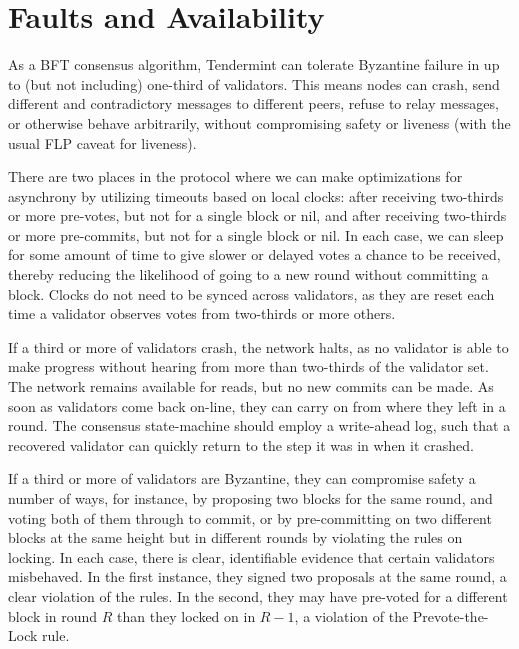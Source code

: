%
%
%


\section{Faults and Availability}

As a BFT consensus algorithm, Tendermint can tolerate Byzantine failure in up to (but not including) one-third of validators.
This means nodes can crash, send different and contradictory messages to different peers, refuse to relay messages, or otherwise behave arbitrarily,
without compromising safety or liveness (with the usual FLP caveat for liveness).

There are two places in the protocol where we can make optimizations for asynchrony by utilizing timeouts based on local clocks:
after receiving two-thirds or more pre-votes, but not for a single block or nil, and after receiving two-thirds or more pre-commits, 
but not for a single block or nil.
In each case, we can sleep for some amount of time to give slower or delayed votes a chance to be received,
thereby reducing the likelihood of going to a new round without committing a block.
Clocks do not need to be synced across validators, as they are reset each time a validator observes votes from two-thirds or more others.

If a third or more of validators crash, the network halts, 
as no validator is able to make progress without hearing from more than two-thirds of the validator set.
The network remains available for reads, but no new commits can be made.
As soon as validators come back on-line, they can carry on from where they left in a round. 
The consensus state-machine should employ a write-ahead log,
such that a recovered validator can quickly return to the step it was in when it crashed.

If a third or more of validators are Byzantine, they can compromise safety a number of ways, 
for instance, by proposing two blocks for the same round, and voting both of them through to commit, 
or by pre-committing on two different blocks at the same height but in different rounds by violating the rules on locking.
In each case, there is clear, identifiable evidence that certain validators misbehaved. 
In the first instance, they signed two proposals at the same round, a clear violation of the rules.
In the second, they may have pre-voted for a different block in round $R$ than they locked on in $R-1$, 
a violation of the Prevote-the-Lock rule.

